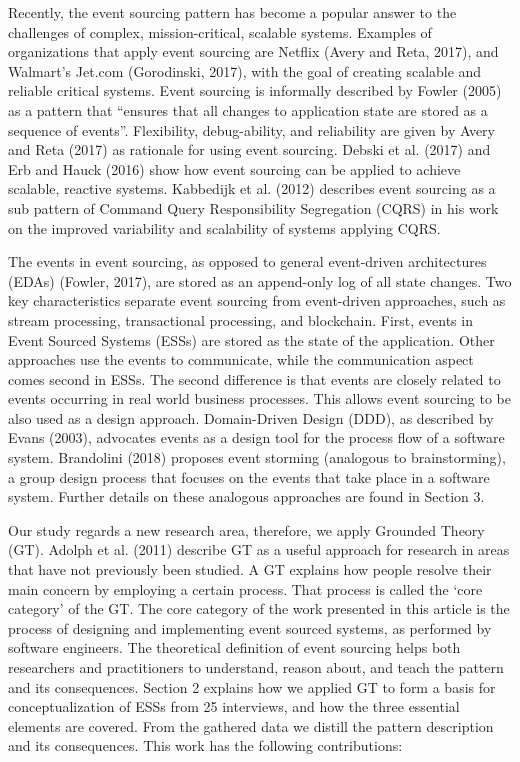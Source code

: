 Recently, the event sourcing pattern has become a popular answer to the challenges of complex, mission-critical, scalable systems. Examples of organizations that apply event sourcing are Netflix (Avery and Reta, 2017), and Walmart’s Jet.com (Gorodinski, 2017), with the goal of creating scalable and reliable critical systems. Event sourcing is informally described by Fowler (2005) as a pattern that “ensures that all changes to application state are stored as a sequence of events”. Flexibility, debug-ability, and reliability are given by Avery and Reta (2017) as rationale for using event sourcing. Debski et al. (2017) and Erb and Hauck (2016) show how event sourcing can be applied to achieve scalable, reactive systems. Kabbedijk et al. (2012) describes event sourcing as a sub pattern of Command Query Responsibility Segregation (CQRS) in his work on the improved variability and scalability of systems applying CQRS.

The events in event sourcing, as opposed to general event-driven architectures (EDAs) (Fowler, 2017), are stored as an append-only log of all state changes. Two key characteristics separate event sourcing from event-driven approaches, such as stream processing, transactional processing, and blockchain. First, events in Event Sourced Systems (ESSs) are stored as the state of the application. Other approaches use the events to communicate, while the communication aspect comes second in ESSs. The second difference is that events are closely related to events occurring in real world business processes. This allows event sourcing to be also used as a design approach. Domain-Driven Design (DDD), as described by Evans (2003), advocates events as a design tool for the process flow of a software system. Brandolini (2018) proposes event storming (analogous to brainstorming), a group design process that focuses on the events that take place in a software system. Further details on these analogous approaches are found in Section 3.


Our study regards a new research area, therefore, we apply Grounded Theory (GT). Adolph et al. (2011) describe GT as a useful approach for research in areas that have not previously been studied. A GT explains how people resolve their main concern by employing a certain process. That process is called the ‘core category’ of the GT. The core category of the work presented in this article is the process of designing and implementing event sourced systems, as performed by software engineers. The theoretical definition of event sourcing helps both researchers and practitioners to understand, reason about, and teach the pattern and its consequences. Section 2 explains how we applied GT to form a basis for conceptualization of ESSs from 25 interviews, and how the three essential elements are covered. From the gathered data we distill the pattern description and its consequences. This work has the following contributions:


